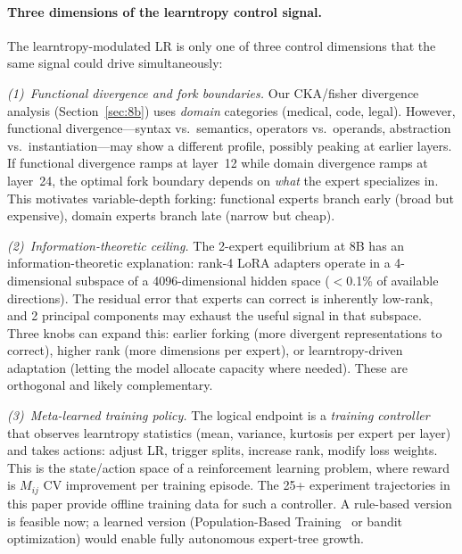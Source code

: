 \documentclass{article}
\begin{document}
\paragraph{Three dimensions of the learntropy control signal.}
The learntropy-modulated LR is only one of three control dimensions that the
same signal could drive simultaneously:

\emph{(1)~Functional divergence and fork boundaries.}
Our CKA/fisher divergence analysis (Section~\ref{sec:8b}) uses
\emph{domain} categories (medical, code, legal). However, functional
divergence---syntax vs.\ semantics, operators vs.\ operands, abstraction
vs.\ instantiation---may show a different profile, possibly peaking at
earlier layers. If functional divergence ramps at layer~12 while domain
divergence ramps at layer~24, the optimal fork boundary depends on
\emph{what} the expert specializes in. This motivates variable-depth
forking: functional experts branch early (broad but expensive), domain
experts branch late (narrow but cheap).

\emph{(2)~Information-theoretic ceiling.}
The 2-expert equilibrium at 8B has an information-theoretic
explanation: rank-4 LoRA adapters operate in a 4-dimensional subspace of a
4096-dimensional hidden space ($<$0.1\% of available directions). The
residual error that experts can correct is inherently low-rank, and 2
principal components may exhaust the useful signal in that subspace. Three
knobs can expand this: earlier forking (more divergent representations to
correct), higher rank (more dimensions per expert), or learntropy-driven
adaptation (letting the model allocate capacity where needed). These are
orthogonal and likely complementary.

\emph{(3)~Meta-learned training policy.}
The logical endpoint is a \emph{training controller} that observes learntropy
statistics (mean, variance, kurtosis per expert per layer) and takes actions:
adjust LR, trigger splits, increase rank, modify loss weights. This is
the state/action space of a reinforcement learning problem, where reward is
$M_{ij}$ CV improvement per training episode. The 25+ experiment trajectories
in this paper provide offline training data for such a controller.
A rule-based version is feasible now; a learned version
(Population-Based Training~\cite{jaderberg2017pbt} or bandit optimization)
would enable fully autonomous expert-tree growth.

\appendix
\end{document}
